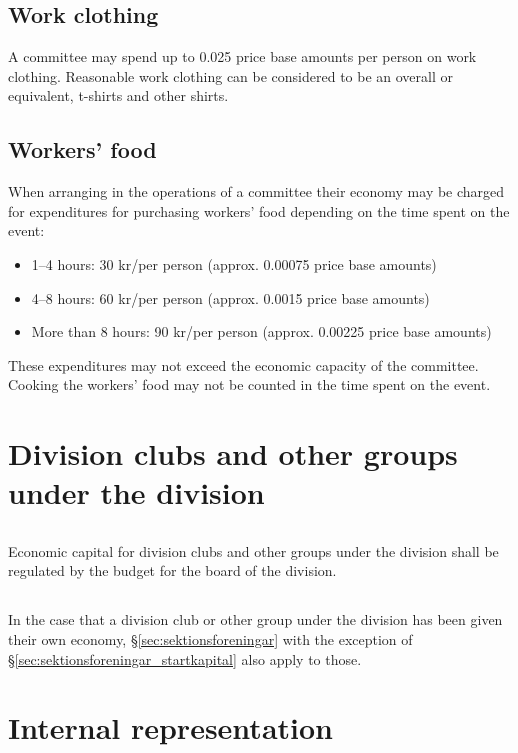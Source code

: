 \documentclass[a4paper]{dtek}
\begin{document}
\subsection{Work clothing}
A committee may spend up to 0.025 price base amounts per person on work clothing. Reasonable work clothing can be considered to be an overall or equivalent, t-shirts and other shirts.

\subsection{Workers' food}
When arranging in the operations of a committee their economy may be charged for expenditures for purchasing workers' food depending on the time spent on the event:
\begin{itemize}
    \item 1--4 hours: 30 kr/per person (approx. 0.00075 price base amounts)
    \item 4--8 hours: 60 kr/per person (approx. 0.0015 price base amounts)
    \item More than 8 hours: 90 kr/per person (approx. 0.00225 price base amounts)
\end{itemize}
These expenditures may not exceed the economic capacity of the committee. Cooking the workers' food may not be counted in the time spent on the event.

\section{Division clubs and other groups under the division}
\subsection{}
Economic capital for division clubs and other groups under the division shall be regulated by the budget for the board of the division.
\subsection{}
In the case that a division club or other group under the division has been given their own economy, §\ref{sec:sektionsforeningar} with the exception of §\ref{sec:sektionsforeningar_startkapital} also apply to those.

\section{Internal representation}
\end{document}
